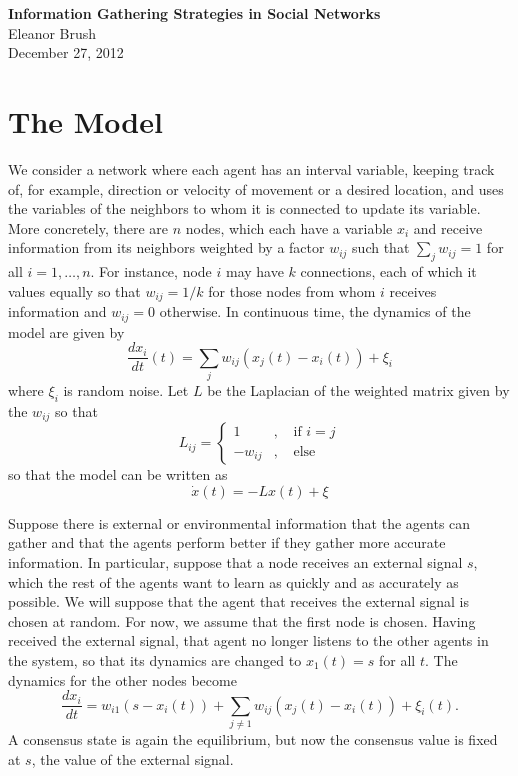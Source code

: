 \documentclass{article}
\begin{document}
\begin{center}
{\bf \LARGE{Information Gathering Strategies in Social Networks}}
\vspace{10pt}
\\ Eleanor Brush
\\ December 27, 2012
\end{center}

\tableofcontents


\section{The Model}

We consider a network where each agent has an interval variable, keeping track of, for example, direction or velocity of movement or a desired location, and uses the variables of the neighbors to whom it is connected to update its variable.  More concretely, there are $n$ nodes, which each have a variable $x_i$ and receive information from its neighbors weighted by a factor $w_{ij}$ such that $\sum_jw_{ij}=1$ for all $i=1,\dots,n$.  For instance, node $i$ may have $k$ connections, each of which it values equally so that $w_{ij}=1/k$ for those nodes from whom $i$ receives information and $w_{ij}=0$ otherwise.  In continuous time, the dynamics of the model are given by
$$\frac{d x_i}{dt}(t)=\sum_jw_{ij}(x_j(t)-x_i(t))+\xi_i$$ 
where $\xi_i$ is random noise.  Let $L$ be the Laplacian of the weighted matrix given by the $w_{ij}$ so that
$$L_{ij}=\left\{\begin{array}{cccc}
1& , & \text{ if } i=j \\
-w_{ij} & , & \text{ else}
\end{array}\right.$$
so that the model can be written as 
$$\dot{x}(t)=-Lx(t)+\xi$$

Suppose there is external or environmental information that the agents can gather and that the agents perform better if they gather more accurate information.  In particular, suppose that a node receives an external signal $s$, which the rest of the agents want to learn as quickly and as accurately as possible.  We will suppose that the agent that receives the external signal is chosen at random.  For now, we assume that the first node is chosen.   Having received the external signal, that agent no longer listens to the other agents in the system, so that its dynamics are changed to $x_1(t)=s$ for all $t$.   The dynamics for the other nodes become
$$\frac{dx_i}{dt}=w_{i1}(s-x_i(t))+\sum_{j\neq 1}w_{ij}(x_j(t)-x_i(t))+\xi_i(t).$$
A consensus state is again the equilibrium, but now the consensus value is fixed at $s$, the value of the external signal.  
\end{document}
